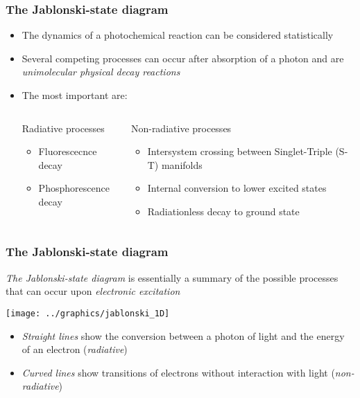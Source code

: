 \documentclass[a4paper,12pt,titlepage]{article}
\begin{document}
\begin{frame}
	\frametitle{The Jablonski-state diagram}
	\begin{itemize}
		\item The dynamics of a photochemical reaction can be considered statistically
		\item Several competing processes can occur after absorption of a photon and are \emph{unimolecular physical decay 			reactions}
		\item The most important are:
			\begin{columns}[t]
					\begin{block}{Radiative processes}
						\begin{itemize}
							\item Fluorescecnce decay
							\item Phosphorescence decay
						\end{itemize}
					\end{block}
					\begin{block}{Non-radiative processes}
						\begin{itemize}
							\item Intersystem crossing between Singlet-Triple (S-T) manifolds
							\item Internal conversion to lower excited states
							\item Radiationless decay to ground state
						\end{itemize}
					\end{block}
			\end{columns}

	\end{itemize}
\end{frame}
		
\begin{frame}
	\frametitle{The Jablonski-state diagram}
	\parbox{\textwidth}{\emph{The Jablonski-state diagram} is essentially a summary of the possible processes that can 					occur upon 	\emph{electronic excitation}}
	\texttt{[image: ../graphics/jablonski\_1D]}
	\begin{itemize}
		\item \emph{Straight lines} show the conversion between a photon of light and the energy of an electron 							(\emph{radiative})
		\item \emph{Curved lines} show transitions of electrons without interaction with light (\emph{non-radiative})
	\end{itemize}
\end{frame}
\end{document}
